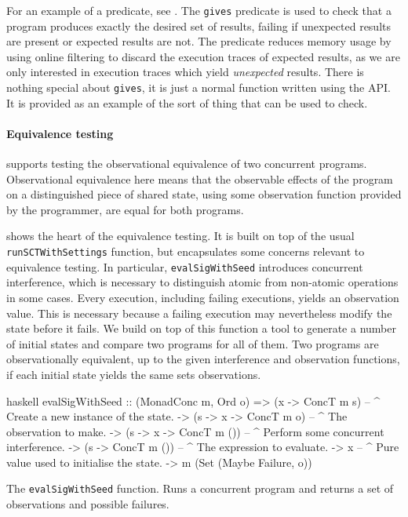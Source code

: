 For an example of a \dejafu{} predicate, see .  The
\verb|gives| predicate is used to check that a program produces
exactly the desired set of results, failing if unexpected results are
present or expected results are not.  The predicate reduces memory
usage by using online filtering to discard the execution traces of
expected results, as we are only interested in execution traces which
yield \emph{unexpected} results.  There is nothing special about
\verb|gives|, it is just a normal function written using the \dejafu{}
API.  It is provided as an example of the sort of thing that \dejafu{}
can be used to check.

\paragraph{Equivalence testing}
\dejafu{} supports testing the observational equivalence of two
concurrent programs.  Observational equivalence here means that the
observable effects of the program on a distinguished piece of shared
state, using some observation function provided by the programmer, are
equal for both programs.

 shows the heart of the equivalence testing.
It is built on top of the usual \verb|runSCTWithSettings| function,
but encapsulates some concerns relevant to equivalence testing.  In
particular, \verb|evalSigWithSeed| introduces concurrent interference,
which is necessary to distinguish atomic from non-atomic operations in
some cases.  Every execution, including failing executions, yields an
observation value.  This is necessary because a failing execution may
nevertheless modify the state before it fails.  We build on top of
this function a tool to generate a number of initial states and
compare two programs for all of them.  Two programs are
observationally equivalent, up to the given interference and
observation functions, if each initial state yields the same sets
observations.

\begin{listing}
\centering
\begin{cminted}{haskell}
evalSigWithSeed :: (MonadConc m, Ord o)
  => (x -> ConcT m s)       -- ^ Create a new instance of the state.
  -> (s -> x -> ConcT m o)  -- ^ The observation to make.
  -> (s -> x -> ConcT m ()) -- ^ Perform some concurrent interference.
  -> (s -> ConcT m ())      -- ^ The expression to evaluate.
  -> x                      -- ^ Pure value used to initialise the state.
  -> m (Set (Maybe Failure, o))
\end{cminted}
\caption[The \texttt{evalSigWithSeed} function.]{The \texttt{evalSigWithSeed} function.  Runs a concurrent program and returns a set of observations and possible failures.}\label{lst:evalSigWithSeed}
\end{listing}

